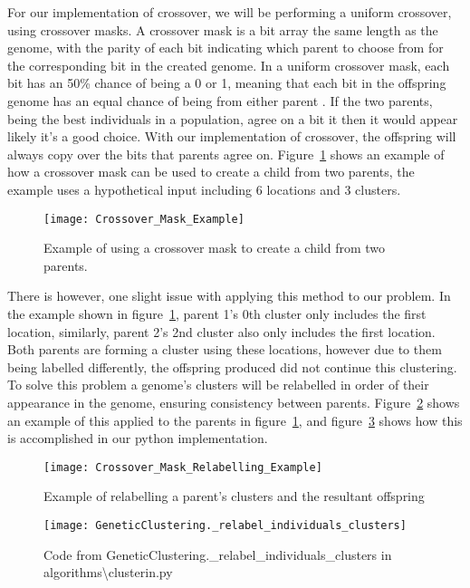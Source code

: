 \noindent
For our implementation of crossover, we will be performing a uniform crossover, using crossover masks.
A crossover mask is a bit array the same length as the genome, with the parity of each bit indicating which parent
to choose from for the corresponding bit in the created genome.
In a uniform crossover mask, each bit has an 50\% chance of being a 0 or 1, meaning that each bit in the offspring
genome has an equal chance of being from either parent
.
If the two parents, being the best individuals in a population, agree on a bit it then it would appear likely it's a
good choice.
With our implementation of crossover, the offspring will always copy over the bits that parents agree on.
Figure~\ref{fig:Crossover_Mask_Example} shows an example of how a crossover mask can be used to create a child from
two parents, the example uses a hypothetical input including 6 locations and 3 clusters.
\begin{figure}[H]
    \centering
    \texttt{[image: Crossover\_Mask\_Example]}
    \caption{Example of using a crossover mask to create a child from two parents.}
    \label{fig:Crossover_Mask_Example}
\end{figure}

\noindent
There is however, one slight issue with applying this method to our problem.
In the example shown in figure~\ref{fig:Crossover_Mask_Example}, parent 1's 0th cluster only includes the first
location, similarly, parent 2's 2nd cluster also only includes the first location.
Both parents are forming a cluster using these locations, however due to them being labelled differently, the
offspring produced did not continue this clustering.
To solve this problem a genome's clusters will be relabelled in order of their appearance in the genome, ensuring
consistency between parents.
Figure~\ref{fig:Crossover_Mask_Relabelling_Example} shows an example of this applied to the parents in figure~\ref{fig:Crossover_Mask_Example},
and figure~\ref{fig:GeneticClustering._relabel_individuals_clusters} shows how this is accomplished in our python
implementation.
\begin{figure}[H]
    \centering
    \texttt{[image: Crossover\_Mask\_Relabelling\_Example]}
    \caption{Example of relabelling a parent's clusters and the resultant offspring}
    \label{fig:Crossover_Mask_Relabelling_Example}
\end{figure}
\begin{figure}[H]
    \centering
    \texttt{[image: GeneticClustering.\_relabel\_individuals\_clusters]}
    \caption{Code from GeneticClustering.\_relabel\_individuals\_clusters in algorithms\textbackslash clusterin.py}
    \label{fig:GeneticClustering._relabel_individuals_clusters}
\end{figure}


